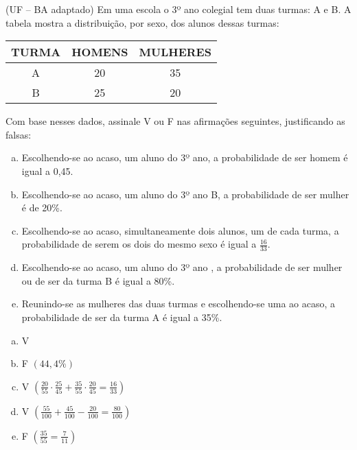 \begin{ex}
(UF – BA adaptado) Em uma escola o 3º ano colegial tem duas turmas: A e B. A tabela mostra a distribuição, por sexo, dos alunos dessas turmas:
\begin{center}
\begin{tabular} {|c|c|c|} \hline
TURMA & HOMENS & MULHERES \\ \hline
A & 20 & 35 \\  \hline
B & 25 & 20 \\  \hline 
\end{tabular}
\end{center}
Com base nesses dados, assinale V ou F nas afirmações seguintes, justificando as falsas:
   \begin{enumerate}[(a)]
   \item 	Escolhendo-se ao acaso, um aluno do 3º ano, a probabilidade de ser homem é igual a 0,45.
   \item 	Escolhendo-se ao acaso, um aluno do 3º ano B, a probabilidade de ser mulher é de 20\%.
   \item 	Escolhendo-se ao acaso, simultaneamente dois alunos, um de cada turma, a probabilidade de serem os dois do mesmo sexo é igual a $\frac{16}{33}$.
   \item	Escolhendo-se ao acaso, um aluno do 3º ano , a probabilidade de ser mulher ou de ser da turma B é igual a 80\%.
   \item Reunindo-se as mulheres das duas turmas e escolhendo-se uma ao acaso, a probabilidade de ser da turma A é igual a 35\%.
   \end{enumerate}
    \begin{sol}
      \phantom{A}
       \begin{enumerate} [(a)]
           \item V
           \item F $(44,4\%)$
           \item V $(\frac{20}{55}\cdot\frac{25}{45 }+\frac{35}{55}\cdot\frac{20}{45}=\frac{16}{33})$
           \item V $(\frac{55}{100}+\frac{45}{100}-\frac{20}{100}=\frac{80}{100})$
           \item F $(\frac{35}{55}=\frac{7}{11})$
       \end{enumerate}
    \end{sol}
\end{ex}
